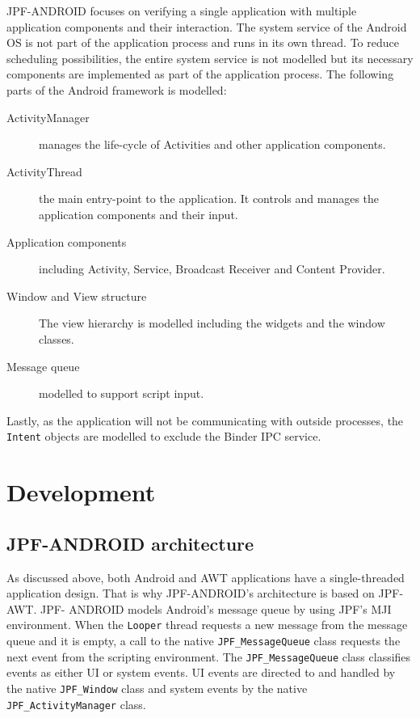 \documentclass{acm_proc_article-sp}
\begin{document}
JPF-ANDROID focuses on verifying a single application with multiple application components and their interaction. The system service of
the Android OS is not part of the application process and runs in its own thread. To reduce scheduling possibilities, the entire system
service is not modelled but its necessary components are implemented as part of the application process. The following parts of the Android
framework is modelled:
\vspace{-10pt}
\begin{description}
 \item [ActivityManager]  manages the life-cycle of Activities and other application components.
 \item [ActivityThread]   the main entry-point to the application. It controls and manages the application components and their input.
 \item [Application components] including Activity, Service, Broadcast Receiver and Content Provider. 
 \item [Window and View structure] The view hierarchy is modelled including the widgets and the window classes.
 \item [Message queue] modelled to support script input.
\end{description}
\vspace{-5pt}
Lastly, as the application will not be communicating with outside processes, the \texttt{Intent} objects are modelled to exclude the
Binder IPC service.

\section{Development}
\subsection{JPF-ANDROID architecture}
As discussed above, both Android and AWT applications have a single-threaded application design. That is why JPF-ANDROID's architecture
is based on JPF-AWT.
JPF- ANDROID models Android's message queue by using JPF's MJI
environment. When the \texttt{Looper} thread requests a new message from the message queue and it is empty, a call to the native
\texttt{JPF\_MessageQueue} class requests the next event from the scripting environment. The \texttt{JPF\_MessageQueue} class classifies
events as either UI or system events. UI events are directed to and handled by the native \texttt{JPF\_Window} class and system events by
the native \texttt{JPF\_ActivityManager} class.
\end{document}

